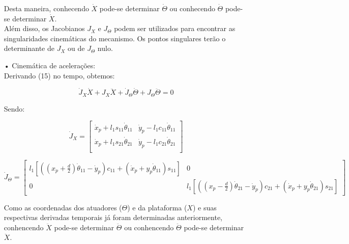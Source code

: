 \documentclass[12pt,a4paper]{article}
\begin{document}
\begin{itemize}
	Desta maneira, conhecendo $\dot{X}$ pode-se determinar $\dot{\Theta}$ ou conhecendo $\dot{\Theta}$ pode-se determinar $\dot{X}$. \\
	
	Além disso, os Jacobianos $J_X$ e $J_\Theta$ podem ser utilizados para encontrar as singularidades cinemáticas do mecanismo. Os pontos singulares terão o determinante de $J_X$ ou de $J_\Theta$ nulo.
	
	\item[•] Cinemática de acelerações: \\
	
	Derivando (15) no tempo, obtemos:
	
	\begin{equation}
	\dot{J}_X \dot{X} + J_X \ddot{X} + \dot{J}_\Theta \dot{\Theta} + J_\Theta \ddot{\Theta} = 0
	\end{equation}
	
	Sendo:
	
	\begin{equation}
	\dot{J}_X =
	\begin{bmatrix}
	\dot{x}_p + l_1 s_{11} \dot{\theta}_{11} & \dot{y}_p - l_1 c_{11} \dot{\theta}_{11} \\
	\dot{x}_p + l_1 s_{21} \dot{\theta}_{21} & \dot{y}_p - l_1 c_{21} \dot{\theta}_{21} \\
	\end{bmatrix}
	\end{equation}
	
	\begin{equation}
	\dot{J}_\Theta =
	\begin{bmatrix}
	l_1 [ ((x_p + \frac{d}{2}) \dot{\theta}_{11} - \dot{y}_p)c_{11} + (\dot{x}_p + y_p \dot{\theta}_{11})s_{11} ] & 0 \\
	0 & l_1 [ ((x_p - \frac{d}{2}) \dot{\theta}_{21} - \dot{y}_p)c_{21} + (\dot{x}_p + y_p \dot{\theta}_{21})s_{21} ]
	\end{bmatrix}
	\end{equation}
	
	Como as coordenadas dos atuadores ($\Theta$) e da plataforma ($X$) e suas respectivas derivadas temporais já foram determinadas anteriormente, conhencendo $\ddot{X}$ pode-se determinar $\ddot{\Theta}$ ou conhencendo $\ddot{\Theta}$ pode-se determinar $\ddot{X}$. 

\end{itemize}

 \\
\end{document}
